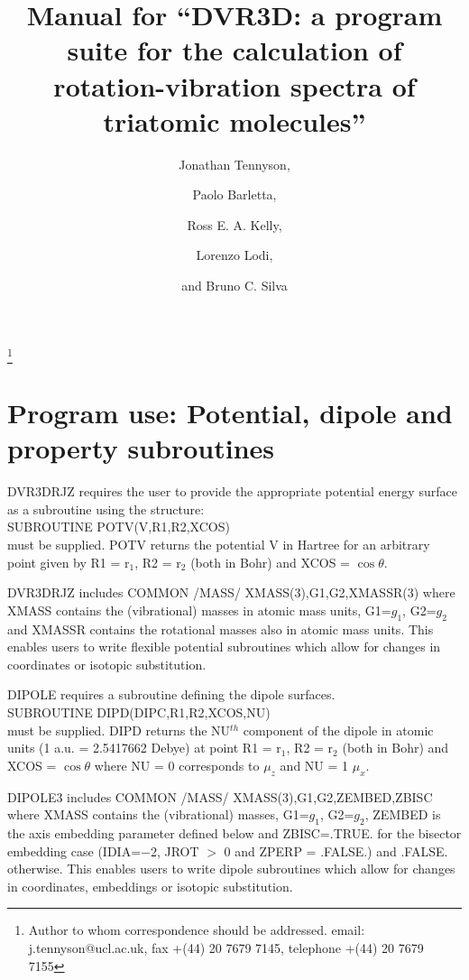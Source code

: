 \documentclass{elsart}
\begin{document}
\begin{frontmatter}

\title{Manual for ``DVR3D: a program suite for the calculation of rotation-vibration
spectra of triatomic molecules''}

\author[UCL]{Jonathan Tennyson,}
\author[UCL]{Paolo Barletta,}
\author[UCL]{Ross E. A. Kelly,}
\author[UCL]{Lorenzo Lodi,}
\author[UCL]{and Bruno C. Silva}

\address[UCL]{Department of Physics and Astronomy, University College London,
London, WC1E~6BT, UK}
\thanks[me] {Author to whom correspondence should be addressed.
email: j.tennyson@ucl.ac.uk, fax +(44) 20 7679 7145, telephone +(44) 20 7679 7155}
\end{frontmatter}
\section{Program use: Potential, dipole and property subroutines}

DVR3DRJZ requires the user to provide the appropriate potential energy
surface as a subroutine using the structure:\\
        SUBROUTINE POTV(V,R1,R2,XCOS)\\
must be supplied. POTV returns the potential V in Hartree for an arbitrary
point given by R1 = r$_1$, R2 = r$_2$ (both in Bohr) and XCOS = $\cos \theta$.


DVR3DRJZ includes
COMMON /MASS/ XMASS(3),G1,G2,XMASSR(3)
where XMASS contains the (vibrational) masses in atomic
mass units, G1=$g_1$, G2=$g_2$ and XMASSR contains the rotational masses
also in atomic
mass units. This enables users to
write flexible potential subroutines which allow for changes in coordinates or
isotopic substitution.


DIPOLE requires a subroutine defining the dipole surfaces. \\
      SUBROUTINE DIPD(DIPC,R1,R2,XCOS,NU)\\
must be supplied. DIPD returns the NU$^{th}$ component of the dipole in atomic
units (1 a.u. = 2.5417662 Debye) at point R1 = r$_1$, R2 = r$_2$ (both in Bohr)
and XCOS = $\cos \theta$ where NU = 0 corresponds to $\mu_z$ and NU = 1
$\mu_x$.

DIPOLE3 includes COMMON /MASS/ XMASS(3),G1,G2,ZEMBED,ZBISC where XMASS
contains the (vibrational) masses, G1=$g_1$, G2=$g_2$, ZEMBED is the
axis embedding parameter defined below and ZBISC=.TRUE. for the
bisector embedding case (IDIA=$-$2, JROT $>$ 0 and ZPERP = .FALSE.) and
.FALSE. otherwise. This enables users to write dipole subroutines
which allow for changes in coordinates, embeddings or isotopic
substitution.
\end{document}

